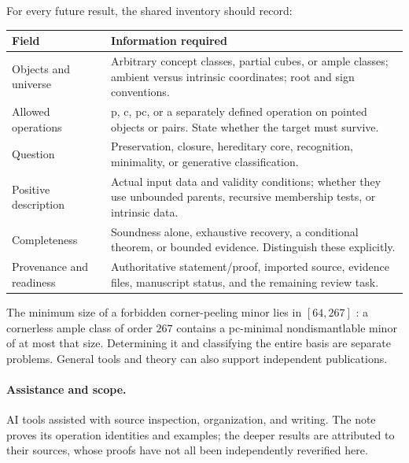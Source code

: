 \documentclass[11pt]{article}
\theoremstyle{definition}
\begin{document}
For every future result, the shared inventory should record:
\begin{center}
\small
\begin{tabular}{@{}>{\raggedright\arraybackslash}p{}
 >{\raggedright\arraybackslash}p{}@{}}
\toprule
Field & Information required\\
\midrule
Objects and universe & Arbitrary concept classes, partial cubes, or ample
classes; ambient versus intrinsic coordinates; root and sign conventions.\\
Allowed operations & p, c, pc, or a separately defined operation on pointed
objects or pairs. State whether the target must survive.\\
Question & Preservation, closure, hereditary core, recognition, minimality,
or generative classification.\\
Positive description & Actual input data and validity conditions; whether
they use unbounded parents, recursive membership tests, or intrinsic data.\\
Completeness & Soundness alone, exhaustive recovery, a conditional theorem,
or bounded evidence. Distinguish these explicitly.\\
Provenance and readiness & Authoritative statement/proof, imported source,
evidence files, manuscript status, and the remaining review task.\\
\bottomrule
\end{tabular}
\end{center}

The minimum size of a forbidden corner-peeling minor lies in $[64,267]$
\cite[Theorem~D]{AmpleCorners}: a cornerless ample class of order $267$
contains a pc-minimal nondismantlable minor of at most that size.
Determining it and classifying the entire basis are separate problems.
General tools and theory can also support independent publications.

\paragraph{Assistance and scope.}
AI tools assisted with source inspection, organization, and writing.
The note proves its operation identities and examples; the deeper results
are attributed to their sources, whose proofs have not all been independently
reverified here.
\end{document}

